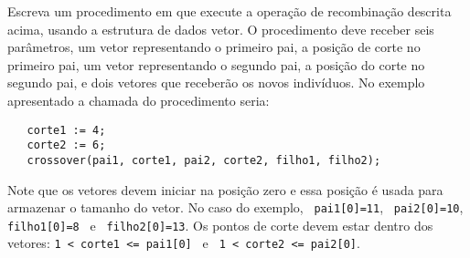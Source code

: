 Escreva um procedimento  em  que   execute a operação   de
recombinação descrita acima, usando  a estrutura de dados vetor.  O
procedimento deve  receber seis parâmetros, um vetor re\-pre\-sentando
o primeiro pai,   a posição  de   corte no   primeiro  pai, um   vetor
re\-pre\-sentando o segundo pai, a posição do corte  no segundo pai, e
dois vetores que receberão os novos indivíduos. No exemplo apresentado
a chamada do procedimento seria:
\vspace{-0.2cm}
\begin{center}
\begin{small}
\begin{verbatim}
   corte1 := 4;
   corte2 := 6;
   crossover(pai1, corte1, pai2, corte2, filho1, filho2);
\end{verbatim}
\end{small}
\end{center}
\vspace{-0.2cm}
Note que os vetores  devem iniciar na   posição zero e essa  posição é
usada para armazenar o tamanho do vetor. No caso do exemplo,
\verb+ pai1[0]=11+, 
\verb+ pai2[0]=10+,
\verb+filho1[0]=8 + e
\verb+ filho2[0]=13+.
Os pontos de corte devem estar dentro dos vetores:
\verb+1 < corte1 <= pai1[0] + e 
\verb+ 1 < corte2 <= pai2[0]+.

